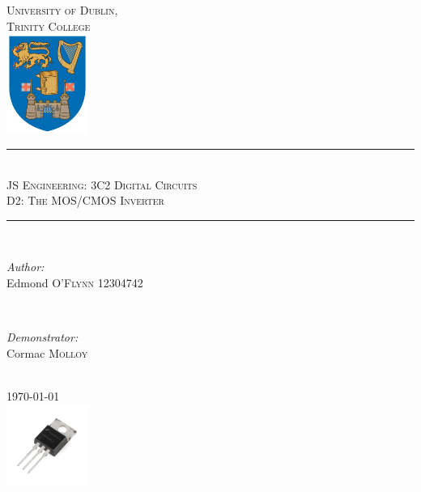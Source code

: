 \documentclass[12pt]{article}
\begin{document}
\begin{titlepage}

\newcommand{\HRule}{\rule{\linewidth}{0.5mm}}

\center
\textsc{\LARGE University of Dublin,\\Trinity College}\\[1.0cm]
\includegraphics[width=0.2\textwidth]{logo.png}

\HRule \\[0.4cm]
\textsc{\Large JS Engineering: 3C2 Digital Circuits}\\[0.25cm]
\textsc{\large D2: The MOS/CMOS Inverter}\\[0.1cm]
\HRule \\[0.4cm]
 
\begin{minipage}{0.5\textwidth}
\begin{flushleft} \large
\emph{Author:}
\\Edmond \textsc{O'Flynn} 12304742
\end{flushleft}
\end{minipage}
~
\begin{minipage}{0.4\textwidth}
\begin{flushleft} 
\large
\emph{Demonstrator:} \\
Cormac \textsc{Molloy} 
\end{flushleft}
\end{minipage}\\[3cm]

{\large \today}\\[2cm] 

\includegraphics[width=0.2\textwidth]{mosfet.jpg}
\clearpage
\end{titlepage}

\end{document}
